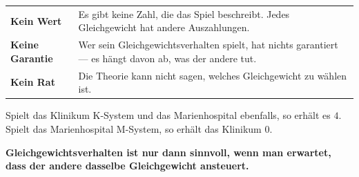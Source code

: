\begin{warnung}
\begin{center}
{\small
\renewcommand{\arraystretch}{1.52}
\begin{tabular}{@{}P{2.4cm}P{6.2cm}@{}}
\toprule
\textbf{Kein Wert} & Es gibt keine Zahl, die das Spiel beschreibt. Jedes Gleichgewicht hat andere Auszahlungen.\\
\textbf{Keine Garantie} & Wer sein Gleichgewichtsverhalten spielt, hat nichts garantiert --- es hängt davon ab, was der andere tut.\\
\textbf{Kein Rat} & Die Theorie kann nicht sagen, welches Gleichgewicht zu wählen ist.\\
\bottomrule
\end{tabular}}
\end{center}

Spielt das Klinikum K-System und das Marienhospital ebenfalls, so erhält es $4$. Spielt das Marienhospital M-System, so erhält das Klinikum $0$.

\begin{center}
\begin{minipage}{0.9\textwidth}
\textbf{Gleichgewichtsverhalten ist nur dann sinnvoll, wenn man erwartet, dass der andere dasselbe Gleichgewicht ansteuert.}
\end{minipage}
\end{center}

\begin{center}
\begin{minipage}{0.88\textwidth}
\end{minipage}
\end{center}

\begin{center}
\begin{minipage}{0.88\textwidth}
\end{minipage}
\end{center}
\end{warnung}

